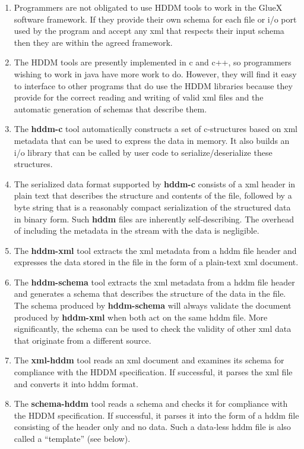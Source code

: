 \documentclass[10pt]{article}
\begin{document}
\begin{enumerate}
\item  Programmers are not obligated to use HDDM tools to work in the GlueX software framework. If they provide their own schema for each file or i/o port used by the program and accept any xml that respects their input schema then they are within the agreed framework. 
\item  The HDDM tools are presently implemented in c and c++, so programmers wishing to work in java have more work to do. However, they will find it easy to interface to other programs that do use the HDDM libraries because they provide for the correct reading and writing of valid xml files and the automatic generation of schemas that describe them. 
\item  The \textbf{hddm-c}
 tool automatically constructs a set of c-structures based on xml metadata that can be used to express the data in memory. It also builds an i/o library that can be called by user code to serialize/deserialize these structures. 
\item  The serialized data format supported by \textbf{hddm-c}
 consists of a xml header in plain text that describes the structure and contents of the file, followed by a byte string that is a reasonably compact serialization of the structured data in binary form. Such \textbf{hddm}
 files are inherently self-describing. The overhead of including the metadata in the stream with the data is negligible. 
\item  The \textbf{hddm-xml}
 tool extracts the xml metadata from a hddm file header and expresses the data stored in the file in the form of a plain-text xml document. 
\item  The \textbf{hddm-schema}
 tool extracts the xml metadata from a hddm file header and generates a schema that describes the structure of the data in the file. The schema produced by \textbf{hddm-schema}
 will always validate the document produced by \textbf{hddm-xml}
 when both act on the same hddm file. More significantly, the schema can be used to check the validity of other xml data that originate from a different source. 
\item  The \textbf{xml-hddm}
 tool reads an xml document and examines its schema for compliance with the HDDM specification. If successful, it parses the xml file and converts it into hddm format. 
\item  The \textbf{schema-hddm}
 tool reads a schema and checks it for compliance with the HDDM specification. If successful, it parses it into the form of a hddm file consisting of the header only and no data. Such a data-less hddm file is also called a ``template'' (see below). 

\end{enumerate}
\end{document}
